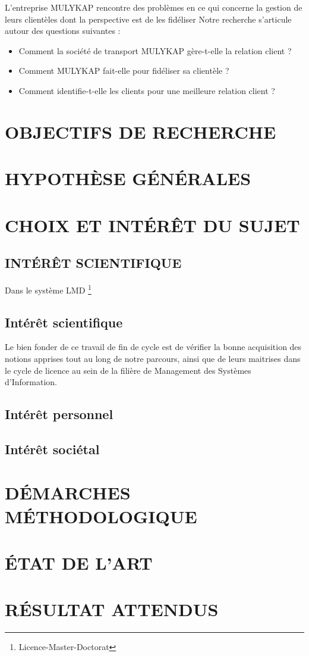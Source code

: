 \documentclass[a4paper,12pt,oneside]{book}
\begin{document}
L’entreprise MULYKAP rencontre des problèmes en ce qui concerne
la gestion de leurs clientèles dont la perspective est de les 
fidéliser 
Notre recherche s’articule autour des questions suivantes : 
\begin{itemize}
    \item Comment la société de transport MULYKAP gère-t-elle
    la relation client ?
    \item Comment MULYKAP fait-elle pour fidéliser sa clientèle ?
    \item Comment identifie-t-elle les clients pour une
    meilleure relation client ?
\end{itemize}

\section[Objectifs de recherche]{OBJECTIFS DE RECHERCHE}

\section[Hyposthèses générales]{HYPOTHÈSE GÉNÉRALES}

\section[Choix et interet du sujet]{CHOIX ET INTÉRÊT DU SUJET}
\subsection[Interet scientifique]{INTÉRÊT SCIENTIFIQUE}
Dans le système LMD \footnote[1]{Licence-Master-Doctorat}

\subsection[Interet scientifique]{Intérêt scientifique}
Le bien fonder de ce travail de fin de cycle est de
vérifier la bonne acquisition des notions apprises tout
au long de notre parcours, ainsi que de leurs maitrises
dans le cycle de licence au sein de la filière de Management
des Systèmes d’Information.

\subsection[Interet personnel]{Intérêt personnel}


\subsection[Interet societal]{Intérêt sociétal}

\section[Démarches méthodologiques]{DÉMARCHES MÉTHODOLOGIQUE}

\section[Etat de l'art]{ÉTAT DE L’ART}

\section[Résultats attenus]{RÉSULTAT ATTENDUS}


\mainmatter

\printbibliography
\end{document}
